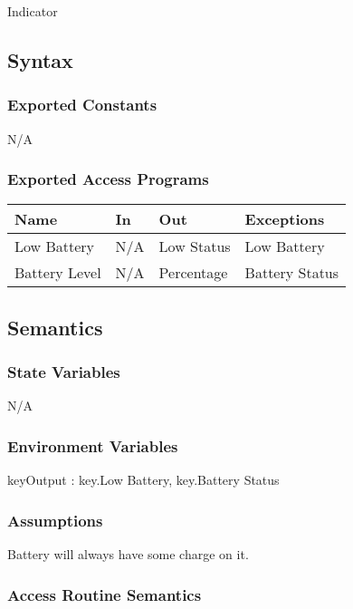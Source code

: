 \documentclass[12pt, titlepage]{article}
\begin{document}
Indicator

\subsection{Syntax}

\subsubsection{Exported Constants}

N/A

\subsubsection{Exported Access Programs}

\begin{center}
\begin{tabular}{p{2cm} p{4cm} p{4cm} p{2cm}}
\hline
\textbf{Name} & \textbf{In} & \textbf{Out} & \textbf{Exceptions} \\
\hline
Low Battery & N/A & Low Status & Low Battery \\
\hline
Battery Level & N/A & Percentage & Battery Status \\
\hline
\end{tabular}
\end{center}

\subsection{Semantics}

\subsubsection{State Variables}

N/A

\subsubsection{Environment Variables}

keyOutput : {key.Low Battery, key.Battery Status}

\subsubsection{Assumptions}

Battery will always have some charge on it.

\subsubsection{Access Routine Semantics}
\end{document}
